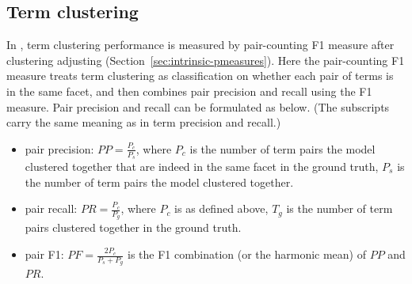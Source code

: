 \subsection{Term clustering}

In \PRF, term clustering performance is measured by pair-counting F1 measure after clustering adjusting (Section~\ref{sec:intrinsic-pmeasures}). Here the pair-counting F1 measure treats term clustering as classification on whether each pair of terms is in the same facet, and then combines pair precision and recall using the F1 measure. Pair precision and recall can be formulated as below. (The subscripts carry the same meaning as in term precision and recall.)
\begin{itemize}
 \item pair precision: $P\!P = \frac{P_c}{P_s}$, where $P_c$ is the number of term pairs the model clustered together that are indeed in the same facet in the ground truth, $P_s$ is the number of term pairs the model clustered together. 
 \item pair recall: $P\!R = \frac{P_c}{P_g}$, where $P_c$ is as defined above, $T_g$ is the number of term pairs clustered together in the ground truth.
 \item pair F1: $P\!F=\frac{2P_c}{P_s+P_g}$ is the F1 combination (or the harmonic mean) of $P\!P$ and $P\!R$.
\end{itemize}

